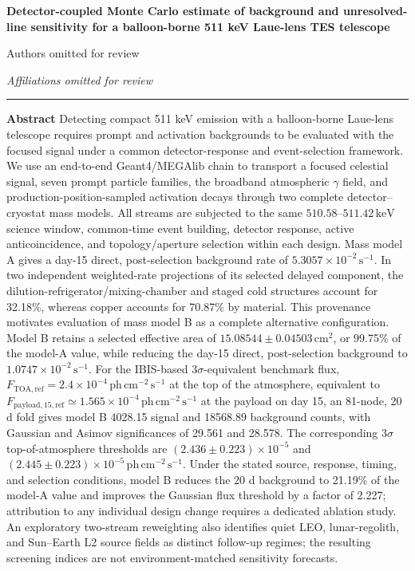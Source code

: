 \documentclass[11pt]{article}
\newcommand{\keV}{\ensuremath{\,\mathrm{keV}}}
\newcommand{\phcms}{\ensuremath{\,\mathrm{ph\,cm^{-2}\,s^{-1}}}}
\newcommand{\cps}{\ensuremath{\,\mathrm{s^{-1}}}}
\newcommand{\ftoaref}{F_{\mathrm{TOA,ref}}}
\newcommand{\fpayloadref}{F_{\mathrm{payload,15,ref}}}
\begin{document}
\thispagestyle{fancy}
\begin{flushleft}
{\LARGE\bfseries Detector-coupled Monte Carlo estimate of background and unresolved-line sensitivity for a balloon-borne 511 keV Laue-lens TES telescope\par}
\vspace{1.1em}
{\large Authors omitted for review\par}
\vspace{0.3em}
{\normalsize\itshape Affiliations omitted for review\par}
\end{flushleft}
\vspace{0.7em}
\noindent\rule{\textwidth}{0.4pt}
\vspace{0.5em}

\noindent\textbf{Abstract}\hspace{0.7em}
Detecting compact 511 keV emission with a balloon-borne Laue-lens telescope
requires prompt and activation backgrounds to be evaluated with the focused
signal under a common detector-response and event-selection framework. We use
an end-to-end Geant4/MEGAlib chain to transport a focused celestial signal,
seven prompt particle families, the broadband atmospheric $\gamma$ field, and
production-position-sampled activation decays through two complete
detector--cryostat mass models. All streams are subjected to the same
$510.58$--$511.42\keV$ science window, common-time event building, detector
response, active anticoincidence, and topology/aperture selection within each
design. Mass model A gives a day-15 direct, post-selection background rate of
$5.3057\times10^{-2}\cps$. In two independent weighted-rate projections of its
selected delayed component, the dilution-refrigerator/mixing-chamber and staged
cold structures account for 32.18\%, whereas copper accounts for 70.87\% by
material.
This provenance motivates evaluation of mass model B as a complete alternative
configuration. Model B retains a selected effective area of
$15.08544\pm0.04503\,\mathrm{cm^2}$, or 99.75\% of the model-A value, while
reducing the day-15 direct, post-selection background to $1.0747\times10^{-2}\cps$.
For the IBIS-based $3\sigma$-equivalent benchmark flux,
$\ftoaref=2.4\times10^{-4}\phcms$ at the top of
the atmosphere, equivalent to $\fpayloadref\simeq1.565\times10^{-4}\phcms$ at
the payload on day 15, an 81-node, 20 d fold gives model B 4028.15 signal and
18568.89 background counts, with Gaussian and Asimov significances of 29.561
and 28.578. The corresponding $3\sigma$ top-of-atmosphere thresholds are
$(2.436\pm0.223)\times10^{-5}$ and
$(2.445\pm0.223)\times10^{-5}\phcms$. Under the stated source, response,
timing, and selection conditions, model B reduces the 20 d background to
21.19\% of the model-A value and improves the Gaussian flux threshold by a
factor of 2.227; attribution to any individual design change requires a
dedicated ablation study.
An exploratory two-stream reweighting also identifies quiet LEO,
lunar-regolith, and Sun--Earth L2 source fields as distinct follow-up regimes;
the resulting screening indices are not environment-matched sensitivity
forecasts.
\end{document}
